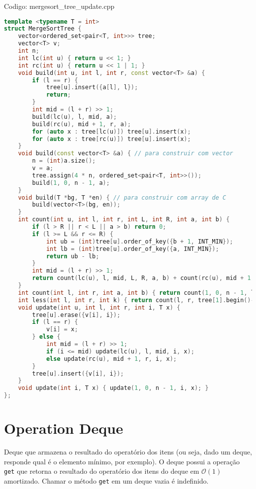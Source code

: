 \documentclass[10pt, a4paper, oneside]{book}
\begin{document}
Codigo: mergesort\_tree\_update.cpp

\begin{lstlisting}[language=C++]
template <typename T = int>
struct MergeSortTree {
    vector<ordered_set<pair<T, int>>> tree;
    vector<T> v;
    int n;
    int lc(int u) { return u << 1; }
    int rc(int u) { return u << 1 | 1; }
    void build(int u, int l, int r, const vector<T> &a) {
        if (l == r) {
            tree[u].insert({a[l], l});
            return;
        }
        int mid = (l + r) >> 1;
        build(lc(u), l, mid, a);
        build(rc(u), mid + 1, r, a);
        for (auto x : tree[lc(u)]) tree[u].insert(x);
        for (auto x : tree[rc(u)]) tree[u].insert(x);
    }
    void build(const vector<T> &a) { // para construir com vector
        n = (int)a.size();
        v = a;
        tree.assign(4 * n, ordered_set<pair<T, int>>());
        build(1, 0, n - 1, a);
    }
    void build(T *bg, T *en) { // para construir com array de C
        build(vector<T>(bg, en));
    }
    int count(int u, int l, int r, int L, int R, int a, int b) {
        if (l > R || r < L || a > b) return 0;
        if (l >= L && r <= R) {
            int ub = (int)tree[u].order_of_key({b + 1, INT_MIN});
            int lb = (int)tree[u].order_of_key({a, INT_MIN});
            return ub - lb;
        }
        int mid = (l + r) >> 1;
        return count(lc(u), l, mid, L, R, a, b) + count(rc(u), mid + 1, r, L, R, a, b);
    }
    int count(int l, int r, int a, int b) { return count(1, 0, n - 1, l, r, a, b); }
    int less(int l, int r, int k) { return count(l, r, tree[1].begin()->first, k - 1); }
    void update(int u, int l, int r, int i, T x) {
        tree[u].erase({v[i], i});
        if (l == r) {
            v[i] = x;
        } else {
            int mid = (l + r) >> 1;
            if (i <= mid) update(lc(u), l, mid, i, x);
            else update(rc(u), mid + 1, r, i, x);
        }
        tree[u].insert({v[i], i});
    }
    void update(int i, T x) { update(1, 0, n - 1, i, x); }
};
\end{lstlisting}
\hfill

\section{Operation Deque}


Deque que armazena o resultado do operatório dos itens (ou seja, dado um deque, responde qual é o elemento mínimo, por exemplo). O deque possui a operação \texttt{get} que retorna o resultado do operatório dos itens do deque em $\mathcal{O}(1)$ amortizado. Chamar o método \texttt{get} em um deque vazia é indefinido.
\end{document}
